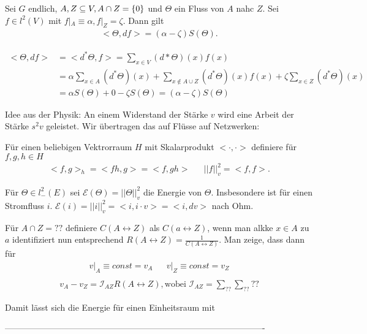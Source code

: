 \begin{lemma}
	Sei $G$ endlich, $A,Z \subseteq V, A\cap Z = \{0\}$ und $\Theta$ ein Fluss von $A$ nahc $Z$. Sei $f \in l^2(V)$ mit $f|_A \equiv \alpha, f|_Z = \zeta$. Dann gilt
	\begin{gather}
		<\Theta,df> = (\alpha - \zeta) S(\Theta).
	\end{gather}
\end{lemma}
\begin{beweis}
	\begin{align}
		<\Theta,df> &= <d^*\Theta,f> = \sum\limits_{x \in V} (d*\Theta)(x)f(x) \\
			&= \alpha\sum\limits_{x\in A} (d^* \Theta)(x) + \sum\limits_{x \notin A \cup Z} (d^*\Theta)(x)f(x) + \zeta\sum\limits_{x\in Z} (d^*\Theta)(x) \\
			&= \alpha S(\Theta) + 0 - \zeta S(\Theta)  = (\alpha - \zeta) S(\Theta)
	\end{align}
\end{beweis}
Idee aus der Physik: An einem Widerstand der Stärke $v$ wird eine Arbeit der Stärke $s^2v$ geleistet. Wir übertragen das auf Flüsse auf Netzwerken:
\begin{definition}
	Für einen beliebigen Vektrorraum $H$ mit Skalarprodukt $<\cdot,\cdot>$ definiere für $f,g,h \in H$
	\begin{align}
		<f,g>_h = <fh,g> = <f,gh> && ||f||^2_v = <f,f>.
	\end{align}
\end{definition}
Für $\Theta \in l^2_-(E)$ sei $\mathcal{E}(\Theta) = ||\Theta||^2_v$ die Energie von $\Theta$. Insbesondere ist für einen Stromfluss $i$. $\mathcal{E}(i) = ||i||^2_v = <i,i\cdot v>  =<i, dv>$ nach Ohm.

\begin{uebung}
	Für $A\cap Z = ??$ definiere $C(A \leftrightarrow Z)$ als $C(a \leftrightarrow Z)$, wenn man alkke $x \in A$ zu $a$ identifiziert nun entsprechend $R(A \leftrightarrow Z) = \frac{1}{C(A \leftrightarrow Z)}$. Man zeige, dass dann für 
	\begin{align} 
		v|_A \equiv const = v_A && v|_Z \equiv const = v_Z \\ 
	\end{align}
	\begin{align}
		v_A - v_Z = \mathcal{I}_{AZ}R(A \leftrightarrow Z), \text{wobei } \mathcal{I}_{AZ} = \sum\limits_{??}\sum\limits_{??}??
	\end{align}
	
	
	Damit lässt sich die Energie für einen Einheitsraum mit 
\end{uebung}
-------------------------------------------------------------------------------------------

